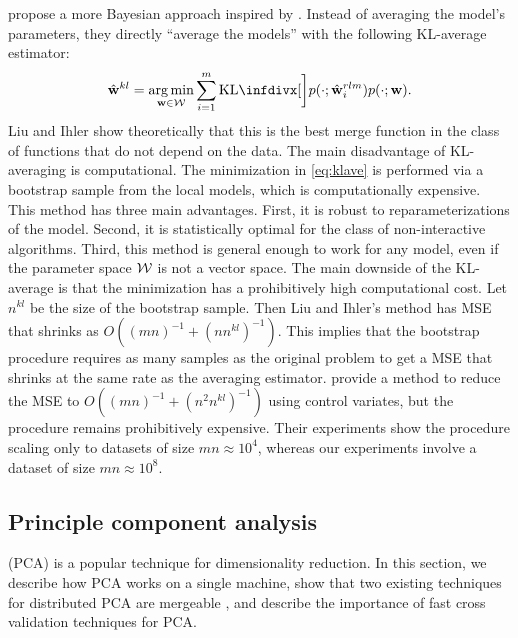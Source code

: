 \documentclass[thesis.tex]{subfiles}
\begin{document}
\citet{liu2014distributed} propose a more Bayesian approach inspired by \citet{merugu2003privacy}.
Instead of averaging the model's parameters,
they directly ``average the models'' with the following KL-average estimator:
\begin{equation}
    \label{eq:klave}
\wkl = \argmin_{\w\in\W} \sum_{i=1}^m \kl[\bigg]{p(\cdot;\wrlm_i)}{p(\cdot;\w)}
.
\end{equation}
Liu and Ihler show theoretically that this is the best merge function in the class of functions that do not depend on the data.
The main disadvantage of KL-averaging is computational.
The minimization in \eqref{eq:klave} is performed via a bootstrap sample from the local models,
which is computationally expensive.
This method has three main advantages.
First, it is robust to reparameterizations of the model.
Second, it is statistically optimal for the class of non-interactive algorithms.
Third, this method is general enough to work for any model,
even if the parameter space ${\mathcal W}$ is not a vector space.
The main downside of the KL-average is that the minimization has a prohibitively high computational cost.
Let $n^{kl}$ be the size of the bootstrap sample.
Then Liu and Ihler's method has MSE that shrinks as $O((mn)^{-1}+(nn^{kl})^{-1})$.
This implies that the bootstrap procedure requires as many samples as the original problem to get a MSE that shrinks at the same rate as the averaging estimator.
\citet{han2016bootstrap} provide a method to reduce the MSE to $O((mn)^{-1}+(n^2n^{kl})^{-1})$ using control variates, but the procedure remains prohibitively expensive.
Their experiments show the procedure scaling only to datasets of size $mn\approx10^4$,
whereas our experiments involve a dataset of size $mn\approx10^8$.


\subsection{Principle component analysis}
\label{sec:merge:pca}

 (PCA) is a popular technique for dimensionality reduction.
In this section,
we describe how PCA works on a single machine,
show that two existing techniques for distributed PCA are mergeable
\citep{qu2002principal,liang2013distributed},
and describe the importance of fast cross validation techniques for PCA.
\end{document}
